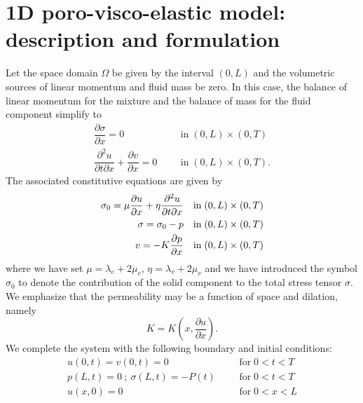 \documentclass[12pt,a4paper]{amsart}
\theoremstyle{definition}
\begin{document}
\section{1D poro-visco-elastic model: description and formulation}\label{sec:1D_problem_and_formulation}

Let the space domain $\Omega$ be given by the
interval $(0,L)$ and the volumetric sources of linear momentum and fluid
mass be zero. In this case, the balance of linear momentum for the mixture
and the balance of mass for the fluid component simplify to
\begin{subequations}\label{eq:1D_model}
\begin{align}
\dfrac{\partial \sigma }{\partial x}=0&  & & \mbox{in}\;(0,L)\times (0,T)
\label{eq:1D_model_in} \\
\dfrac{\partial ^{2}u}{\partial t\partial x}+\dfrac{\partial v}{\partial x}%
=0&  & & \mbox{in}\;(0,L)\times (0,T).  \label{eq:1D_model_in2}
\end{align}%
\end{subequations}
The associated constitutive equations are given by
\begin{subequations}\label{eq:1D_constitutive_laws}
\begin{align}
\sigma _{0}=\mu \dfrac{\partial u}{\partial x}+\eta \dfrac{\partial ^{2}u}{%
\partial t\partial x}&  & & \mbox{in}\;(0,L)\times (0,T) \label{eq:1D_model_sigma_0} \\
\sigma =\sigma _{0}-p&  & & \mbox{in}\;(0,L)\times (0,T)
\label{eq:1D_model_sigma} \\
v=-K\dfrac{\partial p}{\partial x}&  & & \mbox{in}\;(0,L)\times (0,T)
\label{eq:1D_model_v}
\end{align}%
\end{subequations}
where we have set $\mu =\lambda _{e}+2\mu _{e}$, $\eta =\lambda
_{v}+2\mu _{v}$ and we have introduced the symbol $\sigma_0$ to denote the contribution of the solid component to the total stress tensor $\sigma$. We emphasize that the permeability may be a function of space and dilation, namely
$$
K=K\left(x,\frac{\partial u}{\partial x}\right).
$$
We complete the system with the
following boundary and initial conditions:
\begin{subequations}\label{eq:1D_BC_IC_s}
\begin{align}
u\left( 0,t\right) =v\left( 0,t\right) =0&  & & \mbox{for}\;0<t<T
\label{eq:bottom_bc} \\
p\left( L,t\right) =0\ ;\ \sigma \left( L,t\right) =-P\left( t\right) &  & & %
\mbox{for}\;0<t<T  \label{eq:top_bc} \\
u\left( x,0\right) =0&  & & \mbox{for}\;0<x<L  \label{eq:1D_model_end}
\end{align}%
\end{subequations}
\end{document}
